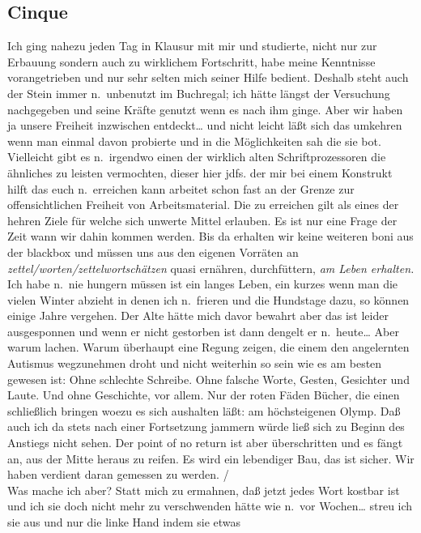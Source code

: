 \documentclass[
]{article}
\author{}
\date{\vspace{-2.5em}}
\begin{document}
\subsection{Cinque}\label{cinque}

Ich ging nahezu jeden Tag in Klausur mit mir und studierte, nicht nur
zur Erbauung sondern auch zu wirklichem Fortschritt, habe meine
Kenntnisse vorangetrieben und nur sehr selten mich seiner Hilfe bedient.
Deshalb steht auch der Stein immer n.~unbenutzt im Buchregal; ich hätte
längst der Versuchung nachgegeben und seine Kräfte genutzt wenn es nach
ihm ginge. Aber wir haben ja unsere Freiheit inzwischen entdeckt\ldots{}
und nicht leicht läßt sich das umkehren wenn man einmal davon probierte
und in die Möglichkeiten sah die sie bot. Vielleicht gibt es n.~irgendwo
einen der wirklich alten Schriftprozessoren die ähnliches zu leisten
vermochten, dieser hier jdfs. der mir bei einem Konstrukt hilft das euch
n.~erreichen kann arbeitet schon fast an der Grenze zur offensichtlichen
Freiheit von Arbeitsmaterial. Die zu erreichen gilt als eines der hehren
Ziele für welche sich unwerte Mittel erlauben. Es ist nur eine Frage der
Zeit wann wir dahin kommen werden. Bis da erhalten wir keine weiteren
boni aus der blackbox und müssen uns aus den eigenen Vorräten an
\emph{zettel/worten/zettelwortschätzen} quasi ernähren, durchfüttern,
\emph{am Leben erhalten.} Ich habe n.~nie hungern müssen ist ein langes
Leben, ein kurzes wenn man die vielen Winter abzieht in denen ich
n.~frieren und die Hundstage dazu, so können einige Jahre vergehen. Der
Alte hätte mich davor bewahrt aber das ist leider ausgesponnen und wenn
er nicht gestorben ist dann dengelt er n.~heute\ldots{} Aber warum
lachen. Warum überhaupt eine Regung zeigen, die einem den angelernten
Autismus wegzunehmen droht und nicht weiterhin so sein wie es am besten
gewesen ist: Ohne schlechte Schreibe. Ohne falsche Worte, Gesten,
Gesichter und Laute. Und ohne Geschichte, vor allem. Nur der roten Fäden
Bücher, die einen schließlich bringen woezu es sich aushalten läßt: am
höchsteigenen Olymp. Daß auch ich da stets nach einer Fortsetzung
jammern würde ließ sich zu Beginn des Anstiegs nicht sehen. Der point of
no return ist aber überschritten und es fängt an, aus der Mitte heraus
zu reifen. Es wird ein lebendiger Bau, das ist sicher. Wir haben
verdient daran gemessen zu werden. /\\
Was mache ich aber? Statt mich zu ermahnen, daß jetzt jedes Wort kostbar
ist und ich sie doch nicht mehr zu verschwenden hätte wie n.~vor
Wochen\ldots{} streu ich sie aus und nur die linke Hand indem sie etwas
\end{document}

